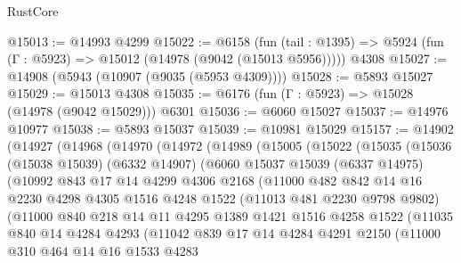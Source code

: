 \begin{lexlean}{RustCore}
\begin{coremodule}
@15013 := @14993 @4299
@15022 := @6158
    (fun (tail : @1395) => @5924 (fun (Γ : @5923) => @15012 (@14978 (@9042 (@15013 @5956)))))
    @4308
@15027 := @14908 (@5943 (@10907 (@9035 (@5953 @4309))))
@15028 := @5893 @15027
@15029 := @15013 @4308
@15035 := @6176 (fun (Γ : @5923) => @15028 (@14978 (@9042 @15029))) @6301
@15036 := @6060 @15027
@15037 := @14976 @10977
@15038 := @5893 @15037
@15039 := @10981 @15029
@15157 := @14902
    (@14927
      (@14968
        (@14970
          (@14972
            (@14989
              (@15005
                (@15022
                  (@15035
                    (@15036
                      (@15038 @15039)
                      (@6332 @14907)
                      (@6060
                        @15037
                        @15039
                        (@6337 @14975)
                        (@10992
                          @843
                          @17
                          @14
                          @4299
                          @4306
                          @2168
                          (@11000
                            @482
                            @842
                            @14
                            @16
                            @2230
                            @4298
                            @4305
                            @1516
                            @4248
                            @1522
                            (@11013 @481 @2230 @9798 @9802)
                            (@11000
                              @840
                              @218
                              @14
                              @11
                              @4295
                              @1389
                              @1421
                              @1516
                              @4258
                              @1522
                              (@11035
                                @840
                                @14
                                @4284
                                @4293
                                (@11042
                                  @839
                                  @17
                                  @14
                                  @4284
                                  @4291
                                  @2150
                                  (@11000
                                    @310
                                    @464
                                    @14
                                    @16
                                    @1533
                                    @4283

\end{coremodule}
\end{lexlean}
